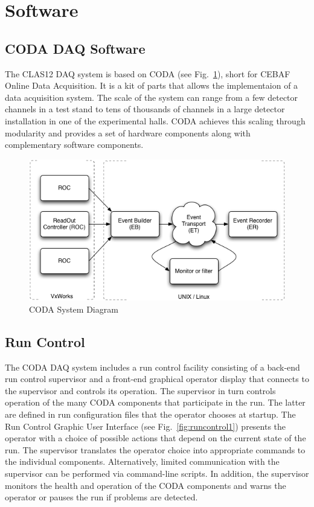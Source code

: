 \section{Software}

\subsection{CODA DAQ Software}

The CLAS12 DAQ system is based on CODA (see Fig.~\ref{fig:coda_diagram}), short for CEBAF Online Data Acquisition. It is a kit of parts that allows the implementaion of a data acquisition system. The scale of the system can range from a few detector channels in a test stand to tens of thousands of channels in a large detector installation in one of the experimental halls. CODA achieves this scaling through modularity and provides a set of hardware components along with complementary software components.

\begin{figure}[hbt]
	\centering
	\includegraphics[width=1.0\columnwidth,keepaspectratio]{img/coda_diagram.png}
	\caption{CODA System Diagram}
	\label{fig:coda_diagram}
\end{figure}


\subsection {Run Control}

The CODA DAQ system includes a run control facility consisting of a back-end run control supervisor and a front-end graphical operator display that connects to the supervisor and controls its operation. The supervisor in turn controls operation of the many CODA components that participate in the run. The latter are defined in run configuration files that the operator chooses at startup. The Run Control Graphic User Interface (see Fig.~\ref{fig:runcontrol1}) presents the operator with a choice of possible actions that depend on the current state of the run. The supervisor translates the operator choice into appropriate commands to the individual components. Alternatively, limited communication with the supervisor can be performed via command-line scripts.
In addition, the supervisor monitors the health and operation of the CODA components and warns the operator or pauses the run if problems are detected.


